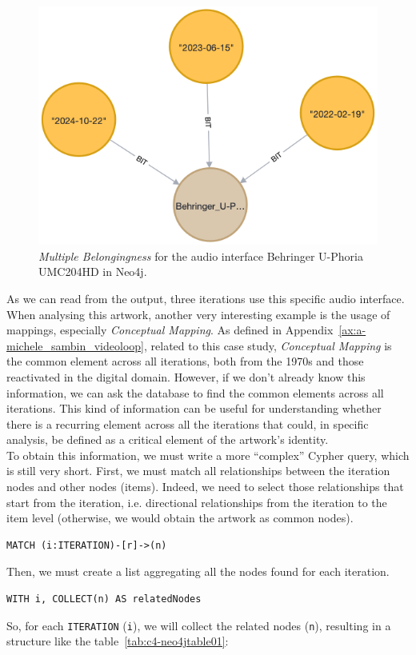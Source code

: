 \begin{figure}[!h]
    \centering
    \includegraphics[width=0.5\linewidth]{chapters/4-MDC_model_application/image/neo4j-multiplebel01.png}
    \caption{\textit{Multiple Belongingness} for the audio interface Behringer U-Phoria UMC204HD in Neo4j.}
    \label{fig:c4-neo4j-multiplebel01}
\end{figure}

As we can read from the output, three iterations use this specific audio interface.\\
When analysing this artwork, another very interesting example is the usage of mappings, especially \textit{Conceptual Mapping}. As defined in Appendix~\ref{ax:a-michele_sambin_videoloop}, related to this case study, \textit{Conceptual Mapping} is the common element across all iterations, both from the 1970s and those reactivated in the digital domain. However, if we don’t already know this information, we can ask the database to find the common elements across all iterations. This kind of information can be useful for understanding whether there is a recurring element across all the iterations that could, in specific analysis, be defined as a critical element of the artwork’s identity.\\
To obtain this information, we must write a more ``complex'' Cypher query, which is still very short. First, we must match all relationships between the iteration nodes and other nodes (items). Indeed, we need to select those relationships that start from the iteration, i.e. directional relationships from the iteration to the item level (otherwise, we would obtain the artwork as common nodes).
\begin{lstlisting}[style=cypher]
MATCH (i:ITERATION)-[r]->(n)
\end{lstlisting}
Then, we must create a list aggregating all the nodes found for each iteration.
\begin{lstlisting}[style=cypher]
WITH i, COLLECT(n) AS relatedNodes
\end{lstlisting}
So, for each \texttt{ITERATION} (\texttt{i}), we will collect the related nodes (\texttt{n}), resulting in a structure like the table~\ref{tab:c4-neo4jtable01}:

